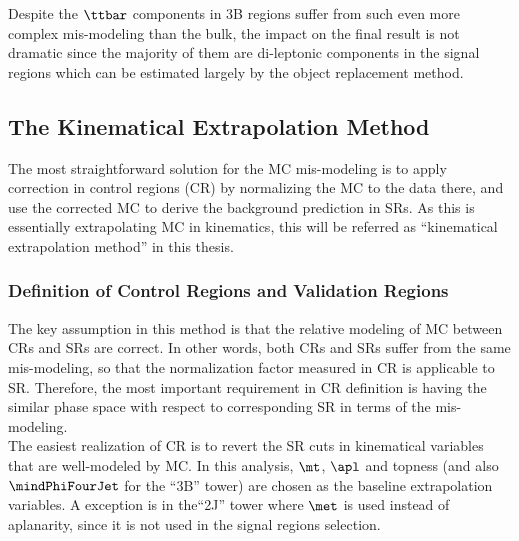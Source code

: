 Despite the $\ttbar$ components in 3B regions suffer from such even more complex mis-modeling than the bulk, the impact on the final result is not dramatic since the majority of them are di-leptonic components in the signal regions which can be estimated largely by the object replacement method.




\clearpage


%
%


\subsection{The Kinematical Extrapolation Method} \label{sec::BGestimation::kineExtp}
The most straightforward solution for the MC mis-modeling is to apply correction in control regions (CR) by normalizing the MC to the data there, and use the corrected MC to derive the background prediction in SRs. As this is essentially extrapolating MC in kinematics, this will be referred as ``kinematical extrapolation method'' in this thesis. \\ 

\subsubsection{Definition of Control Regions and Validation Regions}
The key assumption in this method is that the relative modeling of MC between CRs and SRs are correct. In other words, both CRs and SRs suffer from the same mis-modeling, so that the normalization factor measured in CR is applicable to SR. Therefore, the most important requirement in CR definition is having the similar phase space with respect to corresponding SR in terms of the mis-modeling. \\

The easiest realization of CR is to revert the SR cuts in kinematical variables that are well-modeled by MC. In this analysis, $\mt$, $\apl$ and topness (and also $\mindPhiFourJet$ for the ``3B'' tower) are chosen as the baseline extrapolation variables. 
A exception is in the``2J'' tower where $\met$ is used instead of aplanarity, since it is not used in the signal regions selection.

